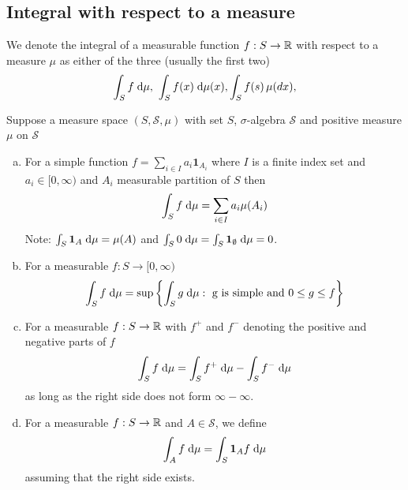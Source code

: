\subsection{Integral with respect to a measure}

We denote the integral of a measurable function $f : S \to \mathbb{R}$ with respect to a measure $\mu$ as either of the three (usually the first two)
\begin{equation}
\int_S f \; \text{d} \mu, \ \int_S f(x) \; \text{d} \mu(x), \int_S f(s) \, \mu(dx),
\end{equation}

\begin{definition}[Integral]
Suppose a measure space $(S, \mathscr{S}, \mu)$ with set $S$, $\sigma$-algebra $\mathscr{S}$ and positive measure $\mu$ on $\mathscr{S}$

\begin{enumerate}[a.]
\item For a simple function $f = \sum_{i \in I} a_i \mathbf{1}_{A_i}$ where $I$ is a finite index set and $a_i \in [0, \infty)$ and $A_i$ measurable partition of $S$ then
\begin{equation}
\int_S f \; \text{d} \mu = \sum_{i \in I} a_i \mu(A_i)
\end{equation}
Note: $\int_S \mathbf{1}_A \; \text{d} \mu = \mu(A)$ and $\int_S 0 \; \text{d} \mu = \int_S \mathbf{1}_{\emptyset} \; \text{d} \mu = 0$.

\item For a measurable $f : S \to [0, \infty)$
\begin{equation}
\int_S f \; \text{d} \mu = \sup \left\{ \int_S g \; \text{d} \mu : \text{ g is simple and } 0 \leq g \leq f \right\}
\end{equation}

\item For a measurable $f : S \to \mathbb{R}$ with $f^+$ and $f^-$ denoting the positive and negative parts of $f$
\begin{equation}
\int_S f \; \text{d} \mu = \int_S f^+ \; \text{d} \mu - \int_S f^- \; \text{d} \mu
\end{equation}
as long as the right side does not form $\infty - \infty$.

\item For a measurable $f : S \to \mathbb{R}$ and $A \in \mathscr{S}$, we define
\begin{equation}
\int_A f \; \text{d} \mu = \int_S \mathbf{1}_A f \; \text{d} \mu
\end{equation}
assuming that the right side exists.

\end{enumerate}
\end{definition}

